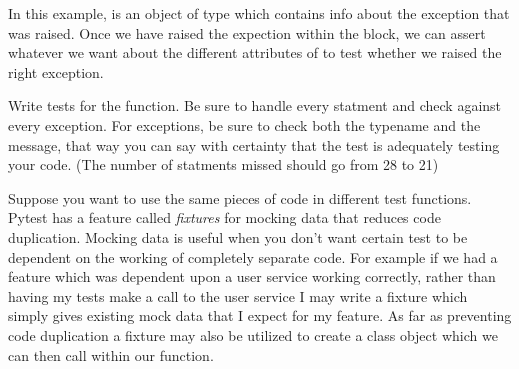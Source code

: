 In this example,  is an object of type  which contains info about the exception that was raised.  Once we have raised the expection within the  block, we can assert whatever we want about the different attributes of  to test whether we raised the right exception.

\begin{problem}
Write tests for the  function.  Be sure to handle every statment and check against every exception.
For exceptions, be sure to check both the typename and the message, that way you can say with certainty that the test is adequately testing your code.
(The number of statments missed should go from 28 to 21)
\end{problem}

Suppose you want to use the same pieces of code in different test functions. Pytest has a feature called \emph{fixtures} for mocking data that reduces code duplication. 
Mocking data is useful when you don't want certain test to be dependent on the working of completely separate code.
For example if we had a feature which was dependent upon a user service working correctly, rather than having my tests make a call to the user service I may write a fixture which simply gives existing mock data that I expect for my feature.
As far as preventing code duplication a fixture may also be utilized to create a class object which we can then call within our function.

